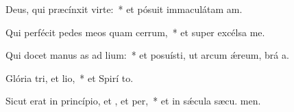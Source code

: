 \item Deus, qui præcínxit  virte:~* et pósuit immaculátam  am.
\item Qui perfécit pedes meos quam cerrum,~* et super excélsa  me.
\item Qui docet manus as ad lium:~* et posuísti, ut arcum ǽreum, brá a.
\item Glória tri, et lio,~* et Spirí to.
\item Sicut erat in princípio, et , et per,~* et in sǽcula sæcu. men.
